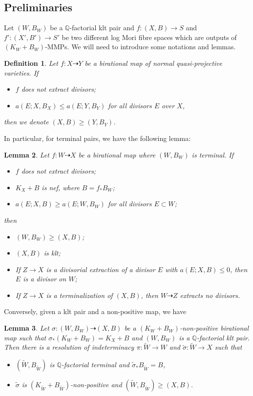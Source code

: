\documentclass[11pt]{amsart}
\newtheorem{defn}{Definition}[section]
\newtheorem{lem}[defn]{Lemma}
\begin{document}
\subsection{Preliminaries}
Let $(W, B_W)$ be a $\mathbb{Q}$-factorial klt pair and $f:(X, B)\to S$ and $f':(X', B')\to S'$ be two different log Mori fibre spaces which are outputs of $(K_{W}+B_{W})$-MMPs.  We will need to introduce some notations and lemmas.
\begin{defn}
  Let $f: X\dashrightarrow Y$ be a birational map of normal quasi-projective varieties. If
  \begin{itemize}
    \item $f$ does not extract divisors;
    \item $a(E;X,B_{X})\leqslant a(E;Y,B_{Y})$ for all divisors  $E$  over $X$,
  \end{itemize}
  then we denote $(X,B)\geqslant (Y,B_{Y})$.
\end{defn}
In particular, for terminal pairs, we have the following lemma:
\begin{lem}\label{terminalorder}
  \cite[Lemma 13.8]{haconMinimalModelProgram2012} Let $f:W\dashrightarrow X$ be a birational map where $(W,B_W)$ is terminal. If
  \begin{itemize}
    \item $f$ does not extract divisors;
    \item $K_X+B$ is nef, where $B=f_*B_W$;
    \item $a(E;X,B)\geqslant a(E;W,B_W)$ for all divisors $E \subset W$;
  \end{itemize}
  then
  \begin{itemize}
    \item $(W,B_W)\geqslant (X,B)$;
    \item $(X,B)$ is klt;
    \item If $Z\to X$ is a divisorial extraction of a divisor $E$ with $a(E;X,B)\leqslant 0$, then $E$ is a divisor on $W$;
    \item If $Z\to X$ is a terminalization of $(X,B)$, then $W\dashrightarrow Z$ extracts no divisors.
  \end{itemize}
\end{lem}
Conversely, given a klt pair and a non-positive map, we have
\begin{lem}\label{terminalresolution}
  \cite[Lemma 3.5]{liuSarkisovProgramGeneralized2021} Let $\sigma:(W,B_W)\dashrightarrow (X,B)$ be a $(K_W+B_W)$-non-positive birational map such that $\sigma_*(K_W+B_W)=K_X+B$ and $(W,B_W)$ is a $\mathbb{Q}$-factorial klt pair. Then there is a resolution of indeterminacy $\pi:\tilde{W}\to W $ and $\tilde{\sigma}:\tilde{W}\to X$ such that
  \begin{itemize}
    \item $(\tilde{W},B_{\tilde{W}})$ is $\mathbb{Q}$-factorial terminal and $\tilde{\sigma}_*B_{\tilde{W}}=B$,
    \item $\tilde{\sigma}$ is $(K_{\tilde{W}}+B_{\tilde{W}})$-non-positive and $(\tilde{W},B_{\tilde{W}})\geqslant (X,B)$.
  \end{itemize}
\end{lem}
\end{document}
